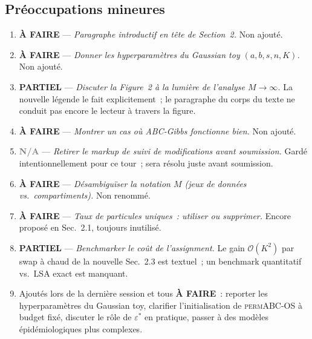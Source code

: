 \documentclass[11pt]{article}
\newcommand{\permABC}{\textsc{permABC}}
\begin{document}
\subsection*{Préoccupations mineures}
\begin{enumerate}[leftmargin=*]
    \item[\textbf{m1.}] \textcolor{red!70!black}{\textbf{À FAIRE}} --- \emph{Paragraphe
    introductif en tête de Section~2.} Non ajouté.
    \item[\textbf{m2.}] \textcolor{red!70!black}{\textbf{À FAIRE}} --- \emph{Donner les
    hyperparamètres du Gaussian toy $(a,b,s,n,K)$.} Non ajouté.
    \item[\textbf{m3.}] \textcolor{orange!85!black}{\textbf{PARTIEL}} --- \emph{Discuter la
    Figure~2 à la lumière de l'analyse $M\to\infty$.} La nouvelle légende le fait explicitement~;
    le paragraphe du corps du texte ne conduit pas encore le lecteur à travers la figure.
    \item[\textbf{m4.}] \textcolor{red!70!black}{\textbf{À FAIRE}} --- \emph{Montrer un cas où
    ABC-Gibbs fonctionne bien.} Non ajouté.
    \item[\textbf{m5.}] \textcolor{gray}{\textbf{N/A}} --- \emph{Retirer le markup de suivi de
    modifications avant soumission.} Gardé intentionnellement pour ce tour~; sera résolu juste
    avant soumission.
    \item[\textbf{m6.}] \textcolor{red!70!black}{\textbf{À FAIRE}} --- \emph{Désambiguïser la
    notation $M$ (jeux de données vs.\ compartiments).} Non renommé.
    \item[\textbf{m7.}] \textcolor{red!70!black}{\textbf{À FAIRE}} --- \emph{Taux de particules
    uniques~: utiliser ou supprimer.} Encore proposé en Sec.~2.1, toujours inutilisé.
    \item[\textbf{m8.}] \textcolor{orange!85!black}{\textbf{PARTIEL}} --- \emph{Benchmarker le
    coût de l'assignment.} Le gain $\mathcal{O}(K^2)$ par swap à chaud de la nouvelle Sec.~2.3
    est textuel~; un benchmark quantitatif vs.\ LSA exact est manquant.
    \item[\textbf{m9--m12.}] Ajoutés lors de la dernière session et tous
    \textcolor{red!70!black}{\textbf{À FAIRE}}~: reporter les hyperparamètres du Gaussian toy,
    clarifier l'initialisation de \permABC-OS à budget fixé, discuter le rôle de $\varepsilon^*$
    en pratique, passer à des modèles épidémiologiques plus complexes.
\end{enumerate}
\end{document}
